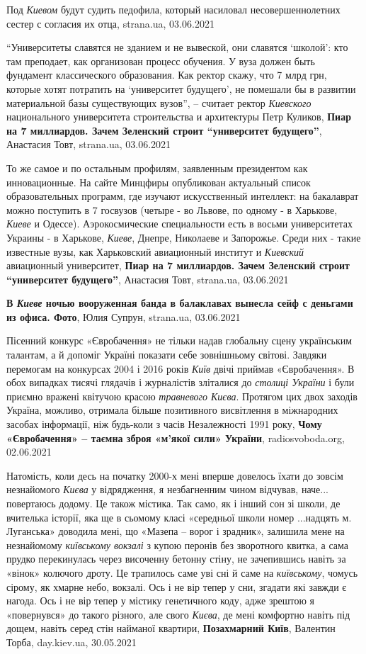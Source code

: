 Под \emph{Киевом} будут судить педофила, который насиловал несовершеннолетних сестер с согласия их отца,
strana.ua, 03.06.2021

\enquote{Университеты славятся не зданием и не вывеской, они славятся
\enquote{школой}: кто там преподает, как организован процесс обучения. У вуза
должен быть фундамент классического образования. Как ректор скажу, что 7 млрд
грн, которые хотят потратить на \enquote{университет будущего}, не помешали бы
в развитии материальной базы существующих вузов}, – считает ректор
\emph{Киевского} национального университета строительства и архитектуры Петр
Куликов, 
\textbf{Пиар на 7 миллиардов. Зачем Зеленский строит \enquote{университет будущего}}, 
Анастасия Товт, strana.ua, 03.06.2021

То же самое и по остальным профилям, заявленным президентом как инновационные.
На сайте Минцфиры опубликован актуальный список образовательных программ, где
изучают искусственный интеллект: на бакалаврат можно поступить в 7 госвузов
(четыре - во Львове, по одному - в Харькове, \emph{Киеве} и Одессе). Аэрокосмические
специальности есть в восьми университетах Украины - в Харькове, \emph{Киеве}, Днепре,
Николаеве и Запорожье. Среди них - такие известные вузы, как Харьковский
авиационный институт и \emph{Киевский} авиационный университет,
\textbf{Пиар на 7 миллиардов. Зачем Зеленский строит \enquote{университет будущего}}, 
Анастасия Товт, strana.ua, 03.06.2021

\textbf{В \emph{Киеве} ночью вооруженная банда в балаклавах вынесла сейф с деньгами из офиса. Фото},
Юлия Супрун, strana.ua, 03.06.2021

Пісенний конкурс «Євробачення» не тільки надав глобальну сцену українським
талантам, а й допоміг Україні показати себе зовнішньому світові. Завдяки
перемогам на конкурсах 2004 і 2016 років \emph{Київ} двічі приймав «Євробачення». В
обох випадках тисячі глядачів і журналістів зліталися до \emph{столиці України} і були
приємно вражені квітучою красою \emph{травневого Києва}. Протягом цих двох заходів
Україна, можливо, отримала більше позитивного висвітлення в міжнародних засобах
інформації, ніж будь-коли з часів Незалежності 1991 року,
\textbf{Чому «Євробачення» – таємна зброя «м'якої сили» України}, radiosvoboda.org, 02.06.2021

Натомість, коли десь на початку 2000-х мені вперше довелось їхати до зовсім
незнайомого \emph{Києва} у відрядження, я незбагненним чином відчував, наче...
повертаюсь додому. Це також містика. Так само, як і інший сон зі школи, де
вчителька історії, яка ще в сьомому класі «середньої школи номер ...надцять м.
Луганська» доводила мені, що «Мазепа – ворог і зрадник», залишила мене на
незнайомому \emph{київському вокзалі} з купою перонів без зворотного квитка, а сама
прудко перекинулась через височенну бетонну стіну, не зачепившись навіть за
«вінок» колючого дроту. Це трапилось саме уві сні й саме на \emph{київському}, чомусь
сірому, як хмарне небо, вокзалі. Ось і не вір тепер у сни, згадати які завжди є
нагода. Ось і не вір тепер у містику генетичного коду, адже зрештою я
«повернувся» до такого різного, але свого \emph{Києва}, де мені комфортно навіть під
дощем, навіть серед стін найманої квартири,
\textbf{Позахмарний Київ}, Валентин Торба, day.kiev.ua, 30.05.2021

